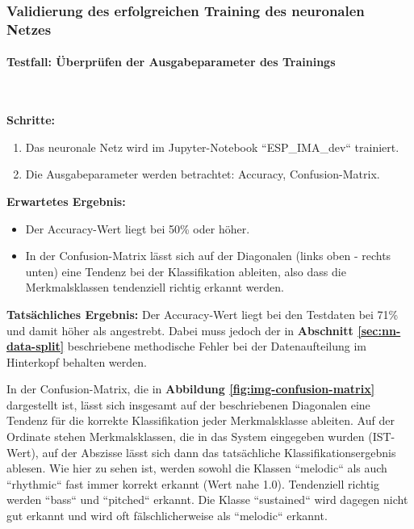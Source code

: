 %
%
%
%

\subsubsection{Validierung des erfolgreichen Training des neuronalen Netzes}
\label{sec:nn-validation}

\paragraph{Testfall: Überprüfen der Ausgabeparameter des Trainings}\mbox{}\\
\begin{adjustwidth}{0.5cm}{0cm}
\textbf{Schritte:}
\begin{enumerate}
	\item Das neuronale Netz wird im Jupyter-Notebook ``ESP\_IMA\_dev`` trainiert.
	\item Die Ausgabeparameter werden betrachtet: Accuracy, Confusion-Matrix.
\end{enumerate}

\textbf{Erwartetes Ergebnis:} 
\begin{itemize}
	\item Der Accuracy-Wert liegt bei 50\% oder höher.
	\item In der Confusion-Matrix lässt sich auf der Diagonalen (links oben - rechts unten) eine Tendenz bei der Klassifikation ableiten, also dass die Merkmalsklassen tendenziell richtig erkannt werden.
\end{itemize}

\textbf{Tatsächliches Ergebnis:} Der Accuracy-Wert liegt bei den Testdaten bei 71\% und damit höher als angestrebt. Dabei muss jedoch der in \textbf{Abschnitt \ref{sec:nn-data-split}} beschriebene methodische Fehler bei der Datenaufteilung im Hinterkopf behalten werden.

In der Confusion-Matrix, die in \textbf{Abbildung \ref{fig:img-confusion-matrix}} dargestellt ist, lässt sich insgesamt auf der beschriebenen Diagonalen eine Tendenz für die korrekte Klassifikation jeder Merkmalsklasse ableiten. Auf der Ordinate stehen Merkmalsklassen, die in das System eingegeben wurden (IST-Wert), auf der Abszisse lässt sich dann das tatsächliche Klassifikationsergebnis ablesen. Wie hier zu sehen ist, werden sowohl die Klassen ``melodic`` als auch ``rhythmic`` fast immer korrekt erkannt (Wert nahe 1.0). Tendenziell richtig werden ``bass`` und ``pitched`` erkannt. Die Klasse ``sustained`` wird dagegen nicht gut erkannt und wird oft fälschlicherweise als ``melodic`` erkannt.


\end{adjustwidth}
